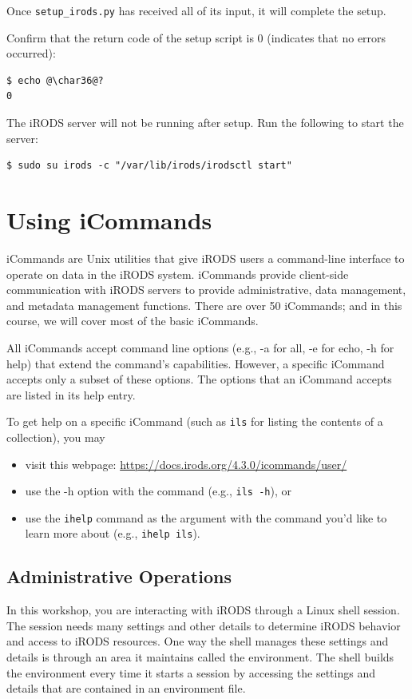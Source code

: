 \documentclass[10pt,oneside]{memoir}
\begin{document}
Once \texttt{setup\_irods.py} has received all of its input, it will complete the setup.

Confirm that the return code of the setup script is 0 (indicates that no errors occurred):
\begin{lstlisting}
$ echo @\char36@?
0
\end{lstlisting}

The iRODS server will not be running after setup. Run the following to start the server:
\begin{lstlisting}
$ sudo su irods -c "/var/lib/irods/irodsctl start"
\end{lstlisting}

\chapter{Using iCommands}

iCommands are Unix utilities that give iRODS users a command-line interface to operate on data in the iRODS system. iCommands provide client-side communication with iRODS servers to provide administrative, data management, and metadata management functions. There are over 50 iCommands; and in this course, we will cover most of the basic iCommands.

All iCommands accept command line options (e.g., -a for all, -e for echo, -h for help) that extend the command's capabilities. However, a specific iCommand accepts only a subset of these options. The options that an iCommand accepts are listed in its help entry.

To get help on a specific iCommand (such as \texttt{ils} for listing the contents of a collection), you may
\begin{itemize}
 \item visit this webpage: \url{https://docs.irods.org/4.3.0/icommands/user/}
 \item use the -h option with the command (e.g., \texttt{ils -h}), or
 \item use the \texttt{ihelp} command as the argument with the command you'd like to learn more
         about (e.g., \texttt{ihelp ils}).
\end{itemize}

\section{Administrative Operations}
In this workshop, you are interacting with iRODS through a Linux shell session. The session needs many settings and other details to determine iRODS behavior and access to iRODS resources. One way the shell manages these settings and details is through an area it maintains called the environment. The shell builds the environment every time it starts a session by accessing the settings and details that are contained in an environment file.
\end{document}
